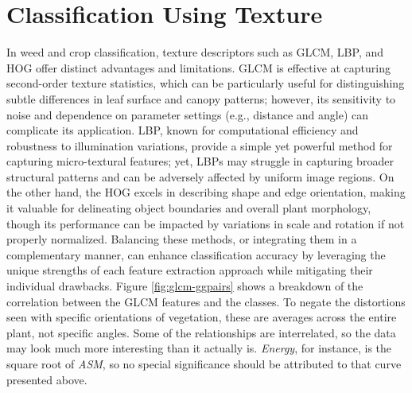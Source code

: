 \documentclass[letterpaper, notitlepage]{report}
\begin{document}
\section{Classification Using Texture}
In weed and crop classification, texture descriptors such as \gls{GLCM}, \gls{LBP}, and \gls{HOG} offer distinct advantages and limitations. \gls{GLCM} is effective at capturing second-order texture statistics, which can be particularly useful for distinguishing subtle differences in leaf surface and canopy patterns; however, its sensitivity to noise and dependence on parameter settings (e.g., distance and angle) can complicate its application. \gls{LBP}, known for computational efficiency and robustness to illumination variations, provide a simple yet powerful method for capturing micro-textural features; yet, LBPs may struggle in capturing broader structural patterns and can be adversely affected by uniform image regions. On the other hand, the \gls{HOG} excels in describing shape and edge orientation, making it valuable for delineating object boundaries and overall plant morphology, though its performance can be impacted by variations in scale and rotation if not properly normalized. Balancing these methods, or integrating them in a complementary manner, can enhance classification accuracy by leveraging the unique strengths of each feature extraction approach while mitigating their individual drawbacks. Figure \ref{fig:glcm-ggpairs} shows a breakdown of the correlation between the GLCM features and the classes. To negate the distortions seen with specific orientations of vegetation, these are averages across the entire plant, not specific angles. Some of the relationships are interrelated, so the data may look much more interesting than it actually is. \textit{Energy}, for instance, is the square root of \textit{ASM}, so no special significance should be attributed to that curve presented above.
%
%
\end{document}
